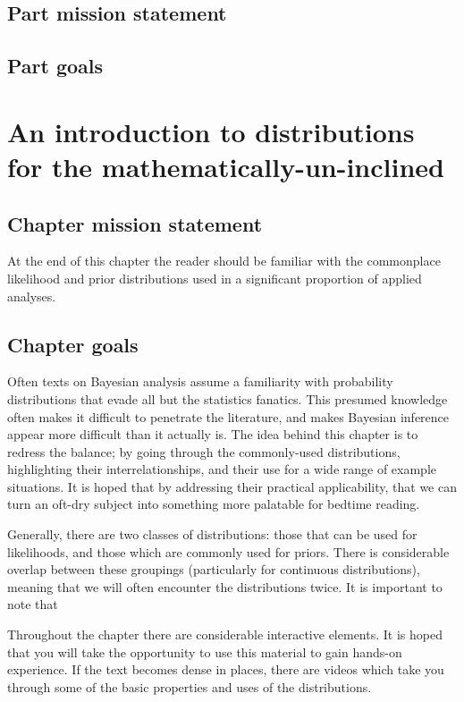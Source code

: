 \documentclass[11pt,fullpage]{book}
\begin{document}
\section{Part mission statement}
\section{Part goals}

\chapter{An introduction to distributions for the mathematically-un-inclined}\label{chap:distributions}
\section{Chapter mission statement}
At the end of this chapter the reader should be familiar with the commonplace likelihood and prior distributions used in a significant proportion of applied analyses.

\section{Chapter goals}
Often texts on Bayesian analysis assume a familiarity with probability distributions that evade all but the statistics fanatics. This presumed knowledge often makes it difficult to penetrate the literature, and makes Bayesian inference appear more difficult than it actually is. The idea behind this chapter is to redress the balance; by going through the commonly-used distributions, highlighting their interrelationships, and their use for a wide range of example situations. It is hoped that by addressing their practical applicability, that we can turn an oft-dry subject into something more palatable for bedtime reading.

Generally, there are two classes of distributions: those that can be used for likelihoods, and those which are commonly used for priors. There is considerable overlap between these groupings (particularly for continuous distributions), meaning that we will often encounter the distributions twice. It is important to note that  

Throughout the chapter there are considerable interactive elements. It is hoped that you will take the opportunity to use this material to gain hands-on experience. If the text becomes dense in places, there are videos which take you through some of the basic properties and uses of the distributions. 
\end{document}
